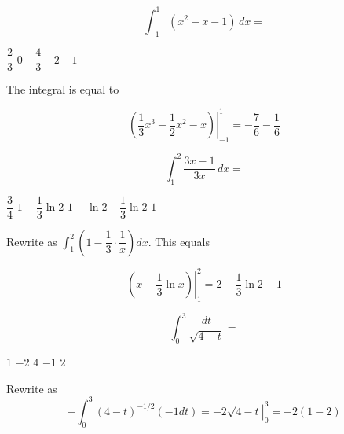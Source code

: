 

\question
\[
\int_{-1}^{1}\left(x^{2}-x-1\right)\,dx=
\]
\begin{choices}
  \choice $\dfrac{2}{3}$
  \choice $0$
  \CorrectChoice $-\dfrac{4}{3}$
  \choice $-2$
  \choice $-1$
\end{choices}
\begin{solution}
The integral is equal to


\[
\left.\left(\dfrac{1}{3} x^{3}-\dfrac{1}{2} x^{2}-x\right)\right|_{-1} ^{1}=-\dfrac{7}{6}-\dfrac{1}{6}
\]


\end{solution}

\question
\[
\int_{1}^{2} \dfrac{3 x-1}{3 x}\,dx=
\]
\begin{choices}
  \choice $\dfrac{3}{4}$
  \CorrectChoice $1-\dfrac{1}{3} \ln 2$
  \choice $1-\ln 2$
  \choice $-\dfrac{1}{3} \ln 2$
  \choice $1$
\end{choices}
\begin{solution}
Rewrite as $\int_{1}^{2}\left(1-\dfrac{1}{3} \cdot \dfrac{1}{x}\right) d x$. This equals


\[
\left.\left(x-\dfrac{1}{3} \ln x\right)\right|_{1} ^{2}=2-\dfrac{1}{3} \ln 2-1
\]


\end{solution}

\question
\[
\int_{0}^{3} \dfrac{d t}{\sqrt{4-t}}=
\]
\begin{choices}
  \choice $1$
  \choice $-2$
  \choice $4$
  \choice $-1$
  \CorrectChoice $2$
\end{choices}
\begin{solution}
Rewrite as
\[
-\int_{0}^{3}(4-t)^{-1 / 2}(-1 d t)=-\left.2 \sqrt{4-t}\right|_{0} ^{3}=-2(1-2)
\]
\end{solution}



\newpage




